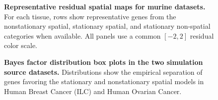 \begin{landscape}
\begin{figure}[H]
\centering
{}
\caption{\textbf{Representative residual spatial maps for murine datasets.} For each tissue, rows show representative genes from the nonstationary spatial, stationary spatial, and stationary non-spatial categories when available. All panels use a common \([-2,2]\) residual color scale.}
\label{fig:s3}
\end{figure}
\end{landscape}

\begin{figure}[H]
\centering
{}
\caption{\textbf{Bayes factor distribution box plots in the two simulation source datasets.} Distributions show the empirical separation of genes favoring the stationary and nonstationary spatial models in Human Breast Cancer (ILC) and Human Ovarian Cancer.}
\label{fig:s4}
\end{figure}

